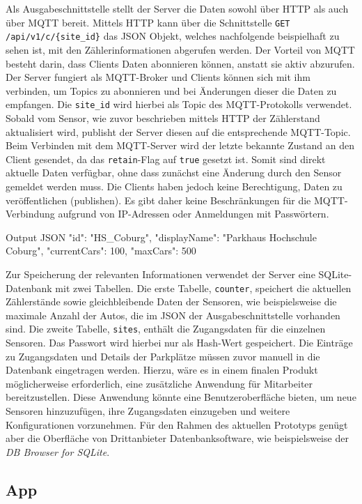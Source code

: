 Als Ausgabeschnittstelle stellt der Server die Daten sowohl über HTTP als auch über MQTT bereit.
Mittels HTTP kann über die Schnittstelle \lstinline|GET /api/v1/c/{site_id}| das JSON Objekt, welches nachfolgende beispielhaft zu sehen ist, mit den Zählerinformationen abgerufen werden.
Der Vorteil von MQTT besteht darin, dass Clients Daten abonnieren können, anstatt sie aktiv abzurufen.
Der Server fungiert als MQTT-Broker und Clients können sich mit ihm verbinden, um Topics zu abonnieren und bei Änderungen dieser die Daten zu empfangen.
Die \lstinline|site_id| wird hierbei als Topic des MQTT-Protokolls verwendet.
Sobald vom Sensor, wie zuvor beschrieben mittels HTTP der Zählerstand aktualisiert wird, publisht der Server diesen auf die entsprechende MQTT-Topic.
Beim Verbinden mit dem MQTT-Server wird der letzte bekannte Zustand an den Client gesendet, da das \lstinline|retain|-Flag auf \lstinline|true| gesetzt ist.
Somit sind direkt aktuelle Daten verfügbar, ohne dass zunächst eine Änderung durch den Sensor gemeldet werden muss.
Die Clients haben jedoch keine Berechtigung, Daten zu veröffentlichen (publishen).
Es gibt daher keine Beschränkungen für die MQTT-Verbindung aufgrund von IP-Adressen oder Anmeldungen mit Passwörtern.

\lstset{language=json, numbers=none}
\begin{center}
    \begin{mylisting}{Output JSON}
{
    "id": "HS_Coburg",
    "displayName": "Parkhaus Hochschule Coburg",
    "currentCars": 100,
    "maxCars": 500
}
    \end{mylisting}
\end{center}

Zur Speicherung der relevanten Informationen verwendet der Server eine SQLite-Datenbank mit zwei Tabellen.
Die erste Tabelle, \lstinline|counter|, speichert die aktuellen Zählerstände sowie gleichbleibende Daten der Sensoren, wie beispielsweise die maximale Anzahl der Autos, die im JSON der Ausgabeschnittstelle vorhanden sind.
Die zweite Tabelle, \lstinline|sites|, enthält die Zugangsdaten für die einzelnen Sensoren.
Das Passwort wird hierbei nur als Hash-Wert gespeichert.
Die Einträge zu Zugangsdaten und Details der Parkplätze müssen zuvor manuell in die Datenbank eingetragen werden.
Hierzu, wäre es in einem finalen Produkt möglicherweise erforderlich, eine zusätzliche Anwendung für Mitarbeiter bereitzustellen.
Diese Anwendung könnte eine Benutzeroberfläche bieten, um neue Sensoren hinzuzufügen, ihre Zugangsdaten einzugeben und weitere Konfigurationen vorzunehmen.
Für den Rahmen des aktuellen Prototyps genügt aber die Oberfläche von Drittanbieter Datenbanksoftware, wie beispielsweise der \textit{DB Browser for SQLite}.

\subsection{App}\label{ch:Architektur_App}
% 
